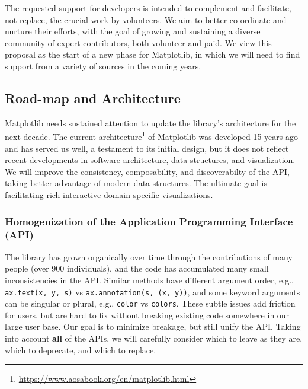 \documentclass[11pt,letterpaper]{article}  %
\begin{document}
The requested support for developers is intended to complement and
facilitate, not replace, the crucial work by volunteers.  We aim to
better co-ordinate and nurture their
efforts, with the goal of growing and sustaining a diverse community
of expert contributors, both volunteer and paid.  We view
this proposal as the start of a new phase for Matplotlib, in which we
will need to find support from a variety of sources in the coming years.



\subsection{Road-map and Architecture}

Matplotlib needs sustained attention to update the library's
architecture for the next decade.
The current
architecture\footnote{\url{https://www.aosabook.org/en/matplotlib.html}}
of Matplotlib was developed 15 years ago \cite{Hunter:2007} and has served
us well, a testament to its initial design, but it
does not reflect recent developments in software architecture, data
structures, and visualization.
We will improve the consistency, composability, and discoverabilty of the API,
taking better advantage of modern data structures.  The
ultimate goal is facilitating rich interactive domain-specific visualizations.



\subsubsection{Homogenization of the Application Programming Interface (API)}
\label{sec:api_hom}
The library has grown organically over time through the contributions
of many people (over 900 individuals), and the code has accumulated
many small inconsistencies in the API.  Similar methods have different
argument order, e.g., \texttt{ax.text(x, y, s)} vs
\texttt{ax.annotation(s, (x, y))}, and some keyword arguments can be
singular or plural, e.g., \texttt{color} vs \texttt{colors}.  These
subtle issues add friction for users, but are hard to fix without
breaking existing code somewhere in our large user base.  Our goal is
to minimize breakage, but still unify the API.  Taking into account
\textbf{all} of the APIs, we will carefully consider which to leave as
they are, which to deprecate, and which to replace.
\end{document}
